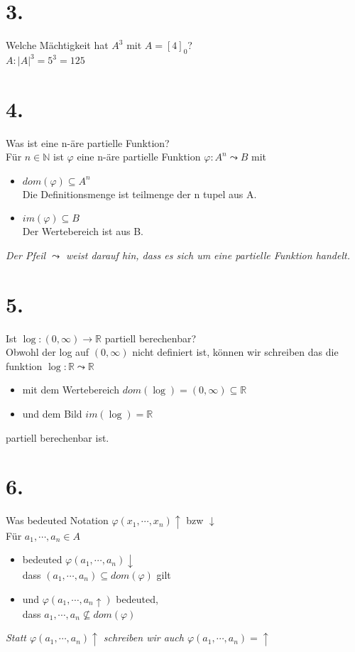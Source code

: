 \section*{3.}
Welche Mächtigkeit hat \(A^3\) mit \(A = [4]_0\)? 
\vspace*{0.5cm}
\\
\(A : |A|^3 = 5^3 = 125\)

\section*{4.}
Was ist eine n-äre partielle Funktion?
\vspace*{0.5cm}
\\
Für \(n \in \mathbb{N}\) ist \(\varphi\) eine n-äre partielle Funktion \(\varphi : A^n \leadsto B\)
mit 
\begin{itemize}
    \item \(dom(\varphi) \subseteq A^n\) \\Die Definitionsmenge ist teilmenge der n tupel aus A.
    \item \(im(\varphi) \subseteq B\) \\Der Wertebereich ist aus B.
\end{itemize}
\textit{ Der Pfeil \(\leadsto\) weist darauf hin, dass es sich um eine partielle Funktion handelt.}

\section*{5.}
Ist \(\log : (0, \infty) \to \mathbb{R}\) partiell berechenbar?
\vspace*{0.5cm}
\\
Obwohl der log auf \((0, \infty)\) nicht definiert ist, können wir schreiben das die funktion
\(\log : \mathbb{R} \leadsto \mathbb{R}\)
\begin{itemize}
    \item mit dem Wertebereich \(dom(\log) = (0,\infty) \subseteq \mathbb{R}\)
    \item und dem Bild \(im(\log) = \mathbb{R}\)
\end{itemize}
partiell berechenbar ist.

\section*{6.}
Was bedeuted Notation \(\varphi(x_1, \cdots, x_n)\uparrow\) bzw \(\downarrow\)
\vspace*{0.5cm}
\\
Für \(a_1, \cdots, a_n \in A\)
\begin{itemize}
    \item  bedeuted \(\varphi(a_1, \cdots, a_n) \downarrow\)\\ 
    dass \((a_1, \cdots, a_n) \subseteq dom(\varphi)\) gilt
    \item  und \(\varphi(a_1, \cdots, a_n \uparrow)\) bedeuted,\\
    dass \(a_1, \cdots, a_n \not \subseteq dom(\varphi)\)
\end{itemize}
\textit{Statt \(\varphi (a_1, \cdots, a_n) \uparrow\) schreiben wir auch \(\varphi(a_1, \cdots, a_n) = \uparrow\)}
